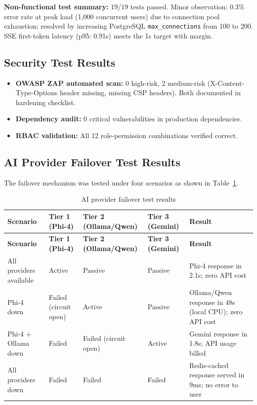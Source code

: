 \textbf{Non-functional test summary:} 19/19 tests passed. Minor observation: 0.3\% error rate at peak load (1,000 concurrent users) due to connection pool exhaustion; resolved by increasing PostgreSQL \texttt{max\_connections} from 100 to 200. SSE first-token latency (p95: 0.91s) meets the 1s target with margin.

\subsection{Security Test Results}

\begin{itemize}
    \item \textbf{OWASP ZAP automated scan:} 0 high-risk, 2 medium-risk (X-Content-Type-Options header missing, missing CSP headers). Both documented in hardening checklist.
    \item \textbf{Dependency audit:} 0 critical vulnerabilities in production dependencies.
    \item \textbf{RBAC validation:} All 12 role-permission combinations verified correct.
\end{itemize}

\subsection{AI Provider Failover Test Results}

The failover mechanism was tested under four scenarios as shown in Table~\ref{tab:failover}.

\begin{longtable}{p{3.5cm}p{2.5cm}p{2.5cm}p{2.5cm}p{2.5cm}}
\caption{AI provider failover test results}
\label{tab:failover}\\
\toprule
\textbf{Scenario} & \textbf{Tier 1 (Phi-4)} & \textbf{Tier 2 (Ollama/Qwen)} & \textbf{Tier 3 (Gemini)} & \textbf{Result} \\
\midrule
\endfirsthead
\toprule
\textbf{Scenario} & \textbf{Tier 1 (Phi-4)} & \textbf{Tier 2 (Ollama/Qwen)} & \textbf{Tier 3 (Gemini)} & \textbf{Result} \\
\midrule
\endhead
All providers available & Active & Passive & Passive & Phi-4 response in 2.1s; zero API cost \\
Phi-4 down & Failed (circuit open) & Active & Passive & Ollama/Qwen response in 48s (local CPU); zero API cost \\
Phi-4 + Ollama down & Failed & Failed (circuit open) & Active & Gemini response in 1.8s; API usage billed \\
All providers down & Failed & Failed & Failed & Redis-cached response served in 9ms; no error to user \\
\bottomrule
\end{longtable}

